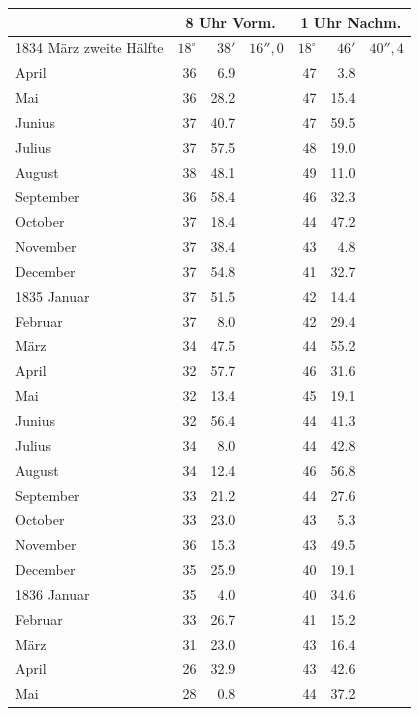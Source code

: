 \documentclass[12pt,a4paper]{article}
\begin{document}
\begin{center}
\small
\begin{tabular}{l@{\hspace{1.5em}}r@{\hspace{0.5em}}r@{\hspace{0.5em}}r@{\hspace{2em}}r@{\hspace{0.5em}}r@{\hspace{0.5em}}r}
& \multicolumn{3}{c}{8 Uhr Vorm.} & \multicolumn{3}{c}{1 Uhr Nachm.} \\
\midrule
1834 M\"arz zweite H\"alfte & $18^\circ$ & $38'$ & $16''{,}0$ & $18^\circ$ & $46'$ & $40''{,}4$ \\
April & 36 & 6.9 & & 47 & 3.8 \\
Mai & 36 & 28.2 & & 47 & 15.4 \\
Junius & 37 & 40.7 & & 47 & 59.5 \\
Julius & 37 & 57.5 & & 48 & 19.0 \\
August & 38 & 48.1 & & 49 & 11.0 \\
September & 36 & 58.4 & & 46 & 32.3 \\
October & 37 & 18.4 & & 44 & 47.2 \\
November & 37 & 38.4 & & 43 & 4.8 \\
December & 37 & 54.8 & & 41 & 32.7 \\
\midrule
1835 Januar & 37 & 51.5 & & 42 & 14.4 \\
Februar & 37 & 8.0 & & 42 & 29.4 \\
M\"arz & 34 & 47.5 & & 44 & 55.2 \\
April & 32 & 57.7 & & 46 & 31.6 \\
Mai & 32 & 13.4 & & 45 & 19.1 \\
Junius & 32 & 56.4 & & 44 & 41.3 \\
Julius & 34 & 8.0 & & 44 & 42.8 \\
August & 34 & 12.4 & & 46 & 56.8 \\
September & 33 & 21.2 & & 44 & 27.6 \\
October & 33 & 23.0 & & 43 & 5.3 \\
November & 36 & 15.3 & & 43 & 49.5 \\
December & 35 & 25.9 & & 40 & 19.1 \\
\midrule
1836 Januar & 35 & 4.0 & & 40 & 34.6 \\
Februar & 33 & 26.7 & & 41 & 15.2 \\
M\"arz & 31 & 23.0 & & 43 & 16.4 \\
April & 26 & 32.9 & & 43 & 42.6 \\
Mai & 28 & 0.8 & & 44 & 37.2 \\
\end{tabular}
\end{center}
\end{document}
